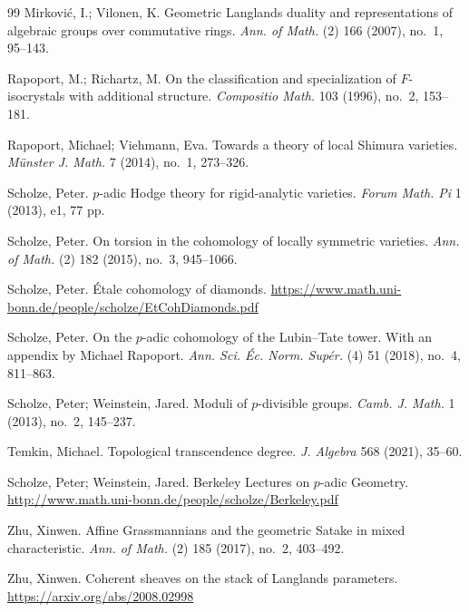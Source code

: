 \begin{thebibliography}{99}
 Mirkovi\'c, I.; Vilonen, K. Geometric Langlands duality and representations
of algebraic groups over commutative rings. \emph{Ann. of Math.} (2) 166 (2007), no.~1, 95--143.

 Rapoport, M.; Richartz, M. On the classification and specialization of
$F$-isocrystals with additional structure. \emph{Compositio Math.} 103 (1996), no.~2, 153--181.

 Rapoport, Michael; Viehmann, Eva. Towards a theory of local Shimura
varieties. \emph{M\"unster J. Math.} 7 (2014), no.~1, 273--326.

 Scholze, Peter. $p$-adic Hodge theory for rigid-analytic varieties.
\emph{Forum Math. Pi} 1 (2013), e1, 77 pp.

 Scholze, Peter. On torsion in the cohomology of locally symmetric varieties.
\emph{Ann. of Math.} (2) 182 (2015), no.~3, 945--1066.

 Scholze, Peter. \'Etale cohomology of diamonds.
\url{https://www.math.uni-bonn.de/people/scholze/EtCohDiamonds.pdf}

 Scholze, Peter. On the $p$-adic cohomology of the Lubin--Tate tower. With an
appendix by Michael Rapoport. \emph{Ann. Sci. \'Ec. Norm. Sup\'er.} (4) 51 (2018), no.~4,
811--863.

 Scholze, Peter; Weinstein, Jared. Moduli of $p$-divisible groups.
\emph{Camb. J. Math.} 1 (2013), no.~2, 145--237.

 Temkin, Michael. Topological transcendence degree. \emph{J. Algebra} 568
(2021), 35--60.

 Scholze, Peter; Weinstein, Jared. Berkeley Lectures on $p$-adic Geometry.
\url{http://www.math.uni-bonn.de/people/scholze/Berkeley.pdf}

 Zhu, Xinwen. Affine Grassmannians and the geometric Satake in mixed
characteristic. \emph{Ann. of Math.} (2) 185 (2017), no.~2, 403--492.

 Zhu, Xinwen. Coherent sheaves on the stack of Langlands parameters.
\url{https://arxiv.org/abs/2008.02998}

\end{thebibliography}
